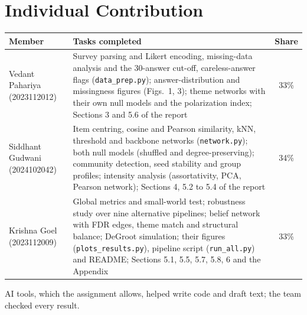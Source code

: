 \documentclass[10pt,a4paper]{article}
\begin{document}
\section{Individual Contribution}
\begin{table}[H]\centering\small
\begin{tabularx}{\linewidth}{l X c}\toprule
Member & Tasks completed & Share\\\midrule
Vedant Pahariya (2023112012) & Survey parsing and Likert encoding, missing-data analysis and the 30-answer cut-off, careless-answer flags (\texttt{data\_prep.py}); answer-distribution and missingness figures (Figs.\ 1, 3); theme networks with their own null models and the polarization index; Sections 3 and 5.6 of the report & 33\%\\
Siddhant Gudwani (2024102042) & Item centring, cosine and Pearson similarity, kNN, threshold and backbone networks (\texttt{network.py}); both null models (shuffled and degree-preserving); community detection, seed stability and group profiles; intensity analysis (assortativity, PCA, Pearson network); Sections 4, 5.2 to 5.4 of the report & 34\%\\
Krishna Goel (2023112009) & Global metrics and small-world test; robustness study over nine alternative pipelines; belief network with FDR edges, theme match and structural balance; DeGroot simulation; their figures (\texttt{plots\_results.py}), pipeline script (\texttt{run\_all.py}) and README; Sections 5.1, 5.5, 5.7, 5.8, 6 and the Appendix & 33\%\\\bottomrule
\end{tabularx}\end{table}
AI tools, which the assignment allows, helped write code and draft text; the team checked every result.

\newpage
\appendix
\end{document}
